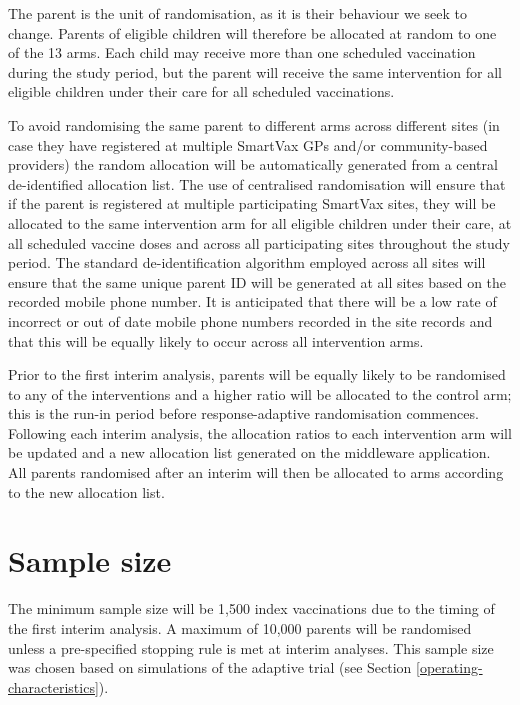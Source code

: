\documentclass[
  bibliography=totoc]{scrreprt}
\begin{document}
The parent is the unit of randomisation, as it is their behaviour we seek to change.
Parents of eligible children will therefore be allocated at random to one of the 13 arms.
Each child may receive more than one scheduled vaccination during the study period, but the parent will receive the same intervention for all eligible children under their care for all scheduled vaccinations.

To avoid randomising the same parent to different arms across different sites (in case they have registered at multiple SmartVax GPs and/or community-based providers) the random allocation will be automatically generated from a central de-identified allocation list.
The use of centralised randomisation will ensure that if the parent is registered at multiple participating SmartVax sites, they will be allocated to the same intervention arm for all eligible children under their care, at all scheduled vaccine doses and across all participating sites throughout the study period.
The standard de-identification algorithm employed across all sites will ensure that the same unique parent ID will be generated at all sites based on the recorded mobile phone number.
It is anticipated that there will be a low rate of incorrect or out of date mobile phone numbers recorded in the site records and that this will be equally likely to occur across all intervention arms.

Prior to the first interim analysis, parents will be equally likely to be randomised to any of the interventions and a higher ratio will be allocated to the control arm; this is the run-in period before response-adaptive randomisation commences.
Following each interim analysis, the allocation ratios to each intervention arm will be updated and a new allocation list generated on the middleware application.
All parents randomised after an interim will then be allocated to arms according to the new allocation list.

\hypertarget{sample-size}{%
\section{Sample size}\label{sample-size}}

The minimum sample size will be 1,500 index vaccinations due to the timing of the first interim analysis.
A maximum of 10,000 parents will be randomised unless a pre-specified stopping rule is met at interim analyses.
This sample size was chosen based on simulations of the adaptive trial (see Section \ref{operating-characteristics}).
\end{document}
